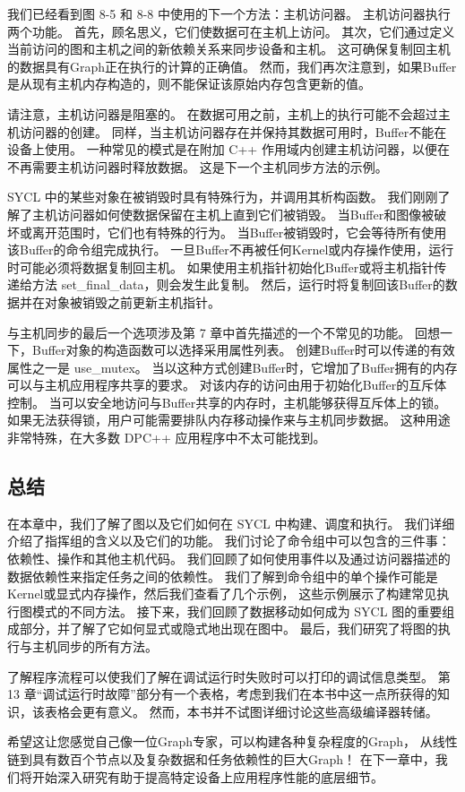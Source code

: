 我们已经看到图 8-5 和 8-8 中使用的下一个方法：主机访问器。 主机访问器执行两个功能。 
首先，顾名思义，它们使数据可在主机上访问。 其次，它们通过定义当前访问的图和主机之间的新依赖关系来同步设备和主机。 
这可确保复制回主机的数据具有Graph正在执行的计算的正确值。 
然而，我们再次注意到，如果Buffer是从现有主机内存构造的，则不能保证该原始内存包含更新的值。

请注意，主机访问器是阻塞的。 在数据可用之前，主机上的执行可能不会超过主机访问器的创建。 
同样，当主机访问器存在并保持其数据可用时，Buffer不能在设备上使用。 
一种常见的模式是在附加 C++ 作用域内创建主机访问器，以便在不再需要主机访问器时释放数据。 
这是下一个主机同步方法的示例。

SYCL 中的某些对象在被销毁时具有特殊行为，并调用其析构函数。 
我们刚刚了解了主机访问器如何使数据保留在主机上直到它们被销毁。 
当Buffer和图像被破坏或离开范围时，它们也有特殊的行为。 
当Buffer被销毁时，它会等待所有使用该Buffer的命令组完成执行。 
一旦Buffer不再被任何Kernel或内存操作使用，运行时可能必须将数据复制回主机。 
如果使用主机指针初始化Buffer或将主机指针传递给方法 set\_final\_data，则会发生此复制。 
然后，运行时将复制回该Buffer的数据并在对象被销毁之前更新主机指针。

与主机同步的最后一个选项涉及第 7 章中首先描述的一个不常见的功能。
回想一下，Buffer对象的构造函数可以选择采用属性列表。 
创建Buffer时可以传递的有效属性之一是 use\_mutex。 
当以这种方式创建Buffer时，它增加了Buffer拥有的内存可以与主机应用程序共享的要求。 
对该内存的访问由用于初始化Buffer的互斥体控制。 
当可以安全地访问与Buffer共享的内存时，主机能够获得互斥体上的锁。 
如果无法获得锁，用户可能需要排队内存移动操作来与主机同步数据。 
这种用途非常特殊，在大多数 DPC++ 应用程序中不太可能找到。

\subsection{总结}
在本章中，我们了解了图以及它们如何在 SYCL 中构建、调度和执行。 
我们详细介绍了指挥组的含义以及它们的功能。 
我们讨论了命令组中可以包含的三件事：依赖性、操作和其他主机代码。 
我们回顾了如何使用事件以及通过访问器描述的数据依赖性来指定任务之间的依赖性。 
我们了解到命令组中的单个操作可能是Kernel或显式内存操作，然后我们查看了几个示例，
这些示例展示了构建常见执行图模式的不同方法。 
接下来，我们回顾了数据移动如何成为 SYCL 图的重要组成部分，并了解了它如何显式或隐式地出现在图中。 
最后，我们研究了将图的执行与主机同步的所有方法。

了解程序流程可以使我们了解在调试运行时失败时可以打印的调试信息类型。 
第 13 章“调试运行时故障”部分有一个表格，考虑到我们在本书中这一点所获得的知识，该表格会更有意义。 
然而，本书并不试图详细讨论这些高级编译器转储。

希望这让您感觉自己像一位Graph专家，可以构建各种复杂程度的Graph，
从线性链到具有数百个节点以及复杂数据和任务依赖性的巨大Graph！ 
在下一章中，我们将开始深入研究有助于提高特定设备上应用程序性能的底层细节。